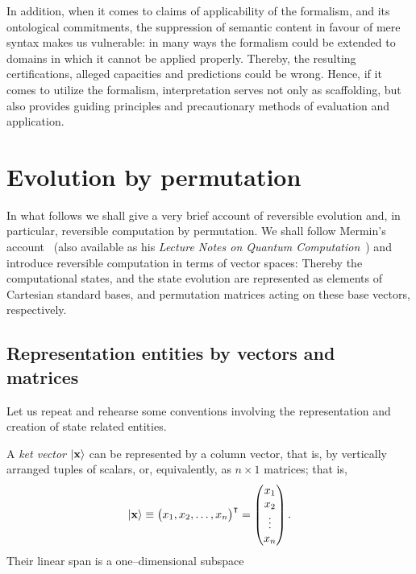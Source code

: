 In addition, when it comes to claims of applicability of the formalism,
and its ontological commitments, the suppression of semantic content in favour of mere syntax makes
us vulnerable:
in many ways the formalism could be extended to domains in which it cannot be applied properly.
Thereby, the resulting certifications, alleged capacities and predictions could be wrong.
Hence, if it comes to utilize the formalism, interpretation serves not only as scaffolding, but also provides
guiding principles and precautionary methods of evaluation and application.


\chapter{Evolution by permutation}
\label{2016-pu-book-chapter-ebp} %


In what follows we shall give a very brief account of reversible evolution and, in particular, reversible computation by permutation.
We shall follow Mermin's account~\cite{mermin-07} (also available as his {\em Lecture Notes on Quantum Computation}~\cite{mermin-04})
and introduce reversible computation in terms of vector spaces: Thereby the computational states, and the state evolution
are represented as elements of Cartesian standard bases, and permutation matrices acting on these base vectors, respectively.

\section{Representation entities by vectors and matrices}

Let us  repeat and rehearse some conventions involving the representation and creation of state related entities.

A {\em ket vector}
$\vert {\bf x}\rangle$
can be represented by a column vector, that is, by vertically arranged tuples of scalars,
or, equivalently, as $n \times 1$ matrices; that is,
\begin{equation}
\vert {\bf x}\rangle
\equiv \begin{pmatrix}
x_1,
x_2,
\ldots ,
x_n
\end{pmatrix}^\intercal
=
\begin{pmatrix}
x_1\\
x_2\\
\vdots \\
x_n
\end{pmatrix}
.
\end{equation}
Their linear span is a one--dimensional subspace



